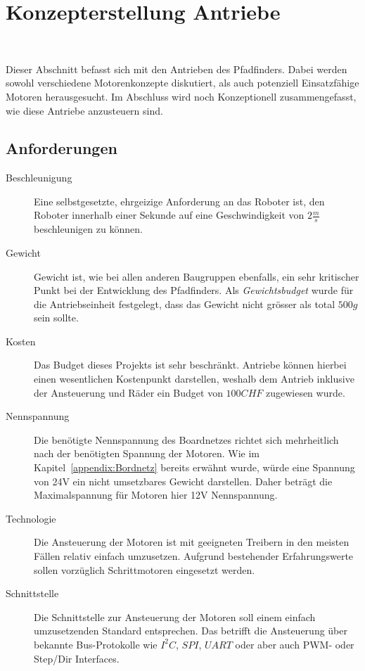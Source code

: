 \documentclass[main.tex]{subfiles} %
\begin{document}
\section{Konzepterstellung Antriebe}~\label{appendix:Antriebe}

Dieser Abschnitt befasst sich mit den Antrieben des Pfadfinders. Dabei werden
sowohl verschiedene Motorenkonzepte diskutiert, als auch potenziell
Einsatzfähige Motoren herausgesucht. Im Abschluss wird noch Konzeptionell
zusammengefasst, wie diese Antriebe anzusteuern sind.

\subsection*{Anforderungen}

\begin{description}
    \item[Beschleunigung] Eine selbstgesetzte, ehrgeizige Anforderung an das Roboter ist,
          den Roboter innerhalb einer Sekunde auf eine Geschwindigkeit von $2 \frac{m}{s}
          $ beschleunigen zu können.

    \item[Gewicht] Gewicht ist, wie bei allen anderen Baugruppen ebenfalls, ein sehr
          kritischer Punkt bei der Entwicklung des Pfadfinders. Als
          \textit{Gewichtsbudget} wurde für die Antriebseinheit festgelegt, dass das
          Gewicht nicht grösser als total $500 g$ sein sollte.

    \item[Kosten] Das Budget dieses Projekts ist sehr beschränkt. Antriebe können hierbei
          einen wesentlichen Kostenpunkt darstellen, weshalb dem Antrieb inklusive der
          Ansteuerung und Räder ein Budget von $100 CHF$ zugewiesen wurde.

    \item[Nennspannung] Die benötigte Nennspannung des Boardnetzes richtet sich
          mehrheitlich nach der benötigten Spannung der Motoren. Wie im
          Kapitel~\ref{appendix:Bordnetz} bereits erwähnt wurde, würde eine Spannung von
          24V ein nicht umsetzbares Gewicht darstellen. Daher beträgt die Maximalspannung
          für Motoren hier 12V Nennspannung.

    \item[Technologie] Die Ansteuerung der Motoren ist mit geeigneten Treibern in den
          meisten Fällen relativ einfach umzusetzen. Aufgrund bestehender Erfahrungswerte
          sollen vorzüglich Schrittmotoren eingesetzt werden.

    \item[Schnittstelle] Die Schnittstelle zur Ansteuerung der Motoren soll einem einfach
          umzusetzenden Standard entsprechen. Das betrifft die Ansteuerung über bekannte
          Bus-Protokolle wie $I^2C$, $SPI$, $UART$ oder aber auch PWM- oder Step/Dir
          Interfaces.

\end{description}
\end{document}
